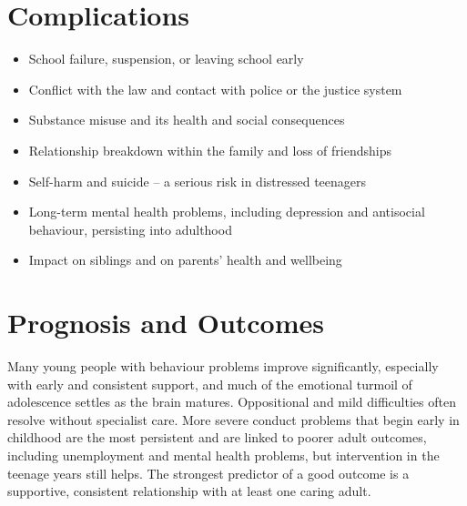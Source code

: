 \section*{Complications}
\begin{itemize}
    \item School failure, suspension, or leaving school early
    \item Conflict with the law and contact with police or the justice system
    \item Substance misuse and its health and social consequences
    \item Relationship breakdown within the family and loss of friendships
    \item Self-harm and suicide -- a serious risk in distressed teenagers
    \item Long-term mental health problems, including depression and antisocial behaviour, persisting into adulthood
    \item Impact on siblings and on parents' health and wellbeing
\end{itemize}

\section*{Prognosis and Outcomes}
Many young people with behaviour problems improve significantly, especially with early and consistent support, and much of the emotional turmoil of adolescence settles as the brain matures. Oppositional and mild difficulties often resolve without specialist care. More severe conduct problems that begin early in childhood are the most persistent and are linked to poorer adult outcomes, including unemployment and mental health problems, but intervention in the teenage years still helps. The strongest predictor of a good outcome is a supportive, consistent relationship with at least one caring adult.

